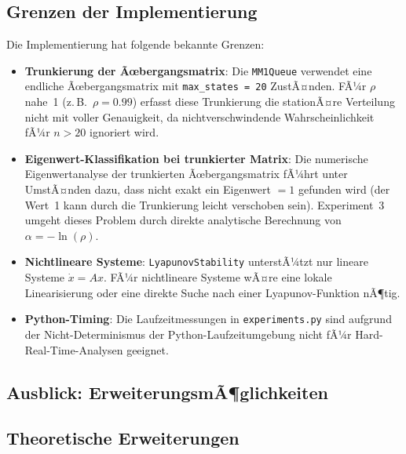 ﻿\documentclass[a4paper,12pt]{report}
\theoremstyle{definition}
\begin{document}
\subsection{Grenzen der Implementierung}
\label{subsubsec:grenzen}

Die Implementierung hat folgende bekannte Grenzen:

\begin{itemize}
	\item \textbf{Trunkierung der Ãœbergangsmatrix}: Die
	\texttt{MM1Queue} verwendet eine endliche Ãœbergangsmatrix
	mit \texttt{max\_states = 20} ZustÃ¤nden.  FÃ¼r $\rho$ nahe~1
	(z.\,B.~$\rho = 0.99$) erfasst diese Trunkierung die
	stationÃ¤re Verteilung nicht mit voller Genauigkeit, da
	nichtverschwindende Wahrscheinlichkeit fÃ¼r $n > 20$ ignoriert
	wird.
	
	\item \textbf{Eigenwert-Klassifikation bei trunkierter Matrix}:
	Die numerische Eigenwertanalyse der trunkierten
	Ãœbergangsmatrix fÃ¼hrt unter UmstÃ¤nden dazu, dass nicht
	exakt ein Eigenwert $= 1$ gefunden wird (der Wert~1 kann
	durch die Trunkierung leicht verschoben sein).  Experiment~3
	umgeht dieses Problem durch direkte analytische Berechnung
	von $\alpha = -\ln(\rho)$.
	
	\item \textbf{Nichtlineare Systeme}: \texttt{LyapunovStability}
	unterstÃ¼tzt nur lineare Systeme $\dot{x} = Ax$.  FÃ¼r
	nichtlineare Systeme wÃ¤re eine lokale Linearisierung oder
	eine direkte Suche nach einer Lyapunov-Funktion nÃ¶tig.
	
	\item \textbf{Python-Timing}: Die Laufzeitmessungen in
	\texttt{experiments.py} sind aufgrund der
	Nicht-Determinismus der Python-Laufzeitumgebung nicht fÃ¼r
	Hard-Real-Time-Analysen geeignet.
\end{itemize}

\subsection{Ausblick: ErweiterungsmÃ¶glichkeiten}
\label{subsec:ausblick}

\subsection{Theoretische Erweiterungen}
\end{document}
